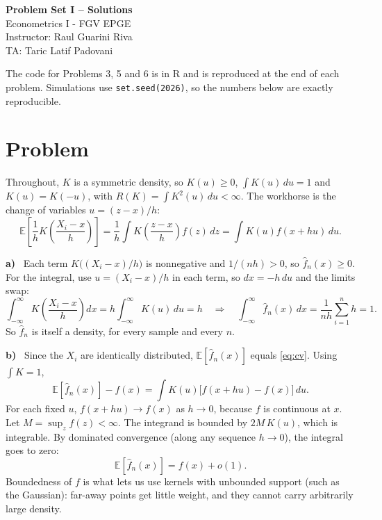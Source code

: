\documentclass[11pt]{article}
\newcommand{\E}{\mathbb{E}}
\theoremstyle{plain}
\newcounter{problem}
\renewcommand{\theproblem}{\arabic{problem}}
\newcommand{\problem}{
	\stepcounter{problem}
	\section*{Problem \theproblem}
}
\newcommand{\itm}[1]{\par\textbf{#1)}\ }
\begin{document}
	\begin{center}
		{\LARGE{\textbf{Problem Set I -- Solutions}}}\\
		\vspace{0.2cm}
		Econometrics I - \textcolor{FGVBlue}{FGV EPGE}\\
		Instructor: Raul Guarini Riva \\
		TA: Taric Latif Padovani
	\end{center}

The code for Problems 3, 5 and 6 is in R and is reproduced at the end of each problem. Simulations use \texttt{set.seed(2026)}, so the numbers below are exactly reproducible.

\problem

Throughout, $K$ is a symmetric density, so $K(u)\ge 0$, $\int K(u)\,du = 1$ and $K(u)=K(-u)$, with $R(K)=\int K^2(u)\,du<\infty$. The workhorse is the change of variables $u=(z-x)/h$:
\begin{equation}\label{eq:cv}
	\E\left[\frac1h K\!\left(\frac{X_i-x}{h}\right)\right] = \frac1h\int K\!\left(\frac{z-x}{h}\right) f(z)\,dz = \int K(u) f(x+hu)\,du .
\end{equation}

\itm{a}
Each term $K\big((X_i-x)/h\big)$ is nonnegative and $1/(nh)>0$, so $\hat f_n(x)\ge 0$. For the integral, use $u=(X_i-x)/h$ in each term, so $dx = -h\,du$ and the limits swap:
\[
\int_{-\infty}^{\infty} K\!\left(\frac{X_i-x}{h}\right)dx = h\int_{-\infty}^{\infty} K(u)\,du = h
\quad\Longrightarrow\quad
\int_{-\infty}^{\infty}\hat f_n(x)\,dx = \frac{1}{nh}\sum_{i=1}^n h = 1 .
\]
So $\hat f_n$ is itself a density, for every sample and every $n$.

\itm{b}
Since the $X_i$ are identically distributed, $\E[\hat f_n(x)]$ equals \eqref{eq:cv}. Using $\int K = 1$,
\[
\E[\hat f_n(x)] - f(x) = \int K(u)\big[f(x+hu)-f(x)\big]\,du .
\]
For each fixed $u$, $f(x+hu)\to f(x)$ as $h\to 0$, because $f$ is continuous at $x$. Let $M=\sup_z f(z)<\infty$. The integrand is bounded by $2M\,K(u)$, which is integrable. By dominated convergence (along any sequence $h\to 0$), the integral goes to zero:
\[
\E[\hat f_n(x)] = f(x) + o(1).
\]
Boundedness of $f$ is what lets us use kernels with unbounded support (such as the Gaussian): far-away points get little weight, and they cannot carry arbitrarily large density.
\end{document}
